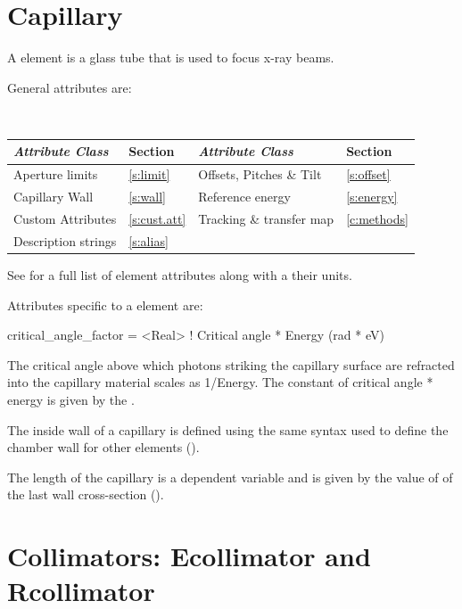 \section{Capillary}
\label{s:capillary}

A  element is a glass tube that is used to focus x-ray
beams.

General  attributes are:
\begin{center}
\tt
\begin{tabular}{llll} \toprule
  {\sl Attribute Class}      & Section          & {\sl Attribute Class}      & Section         \\ \midrule
  Aperture limits            & \ref{s:limit}    & Offsets, Pitches \& Tilt   & \ref{s:offset}  \\ 
  Capillary Wall             & \ref{s:wall}     & Reference energy           & \ref{s:energy}  \\
  Custom Attributes          & \ref{s:cust.att} & Tracking \& transfer map   & \ref{c:methods} \\ 
  Description strings        & \ref{s:alias}    &                            &                 \\
  \bottomrule
\end{tabular}
\end{center}
\toffset
See  for a full list of element attributes along with a their units.

Attributes specific to a  element are:
\begin{example}
  critical_angle_factor = <Real>    ! Critical angle * Energy (rad * eV)
\end{example}

The critical angle above which photons striking the capillary surface are
refracted into the capillary material scales as 1/Energy. The
constant of critical angle * energy is given by the .

The inside wall of a capillary is defined using the same syntax used
to define the chamber wall for other elements ().

The length of the capillary is a dependent variable and is given by
the value of  of the last wall cross-section
().

\section{Collimators: Ecollimator and Rcollimator} 
\label{s:col}

